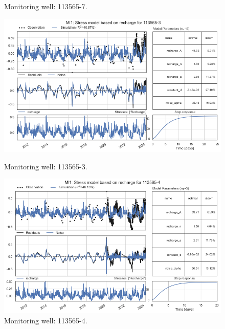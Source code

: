 \begin{figure}[htbp]
\begin{minipage}{0.32\textwidth}
        \caption{Monitoring well: 113565-7.}
        \label{fig:112565-3}
    \end{minipage}
\end{figure}

\begin{figure}[htbp]
    \centering
    \begin{minipage}{0.32\textwidth}
        \centering
        \includegraphics[width=\linewidth]{frontmatter/Rozenburg-fig/13.png}
        \caption{Monitoring well: 113565-3.}
        \label{fig:112565-3}
    \end{minipage}
    \hfill
    \begin{minipage}{0.32\textwidth}
        \centering
        \includegraphics[width=\linewidth]{frontmatter/Rozenburg-fig/14.png}
        \caption{Monitoring well: 113565-4.}
        \label{fig:112565-3}
    \end{minipage}
    \hfill
    \begin{minipage}{0.32\textwidth}

\end{minipage}
\end{figure}
